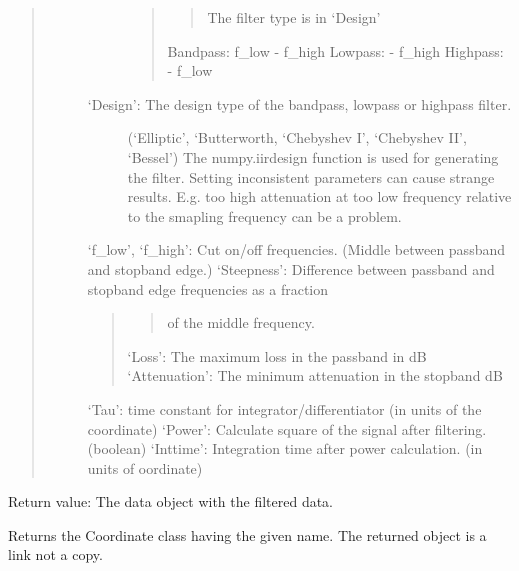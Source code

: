 \documentclass[letterpaper,10pt,english]{sphinxmanual}
\begin{document}
\begin{fulllineitems}
\begin{fulllineitems}
\begin{quote}
\begin{description}
\begin{description}
\begin{quote}
\begin{quote}
The filter type is in ‘Design’
\end{quote}

Bandpass: f\_low - f\_high
Lowpass: - f\_high
Highpass: - f\_low
\end{quote}

\item[{‘Design’: The design type of the bandpass, lowpass or highpass filter.}] \leavevmode
(‘Elliptic’, ‘Butterworth, ‘Chebyshev I’, ‘Chebyshev II’, ‘Bessel’)
The numpy.iirdesign function is used for generating the filter.
Setting inconsistent parameters can cause strange results. E.g. too high attenuation
at too low frequency relative to the smapling frequency can be a problem.

\end{description}

‘f\_low’, ‘f\_high’: Cut on/off frequencies. (Middle between passband and stopband edge.)
‘Steepness’: Difference between passband and stopband edge frequencies as a fraction
\begin{quote}
\begin{quote}

of the middle frequency.
\end{quote}

‘Loss’: The maximum loss in the passband in dB
‘Attenuation’: The minimum attenuation in the stopband dB
\end{quote}

‘Tau’: time constant for integrator/differentiator (in units of the coordinate)
‘Power’: Calculate square of the signal after filtering. (boolean)
‘Inttime’: Integration time after power calculation. (in units of oordinate)

\end{description}
\end{quote}

Return value: The data object with the filtered data.

\end{fulllineitems}


\begin{fulllineitems}
\label{\detokenize{data_object:flap.data_object.DataObject.get_coordinate_object}}
Returns the Coordinate class having the given name. The returned object is a link not a copy.


\end{fulllineitems}
\end{fulllineitems}
\end{document}
